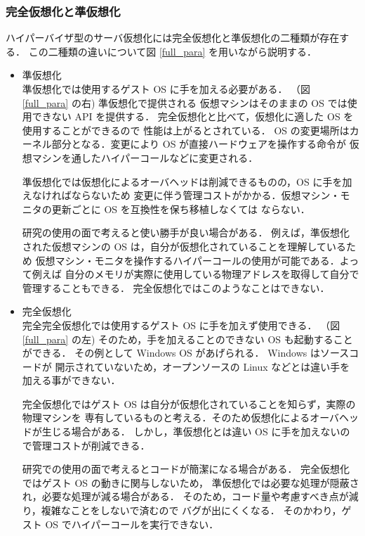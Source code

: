 \documentclass[graduation-thesis]{mlarticle}
\begin{document}
\subsubsection{完全仮想化と準仮想化}
\label{sec-2-1-5}
ハイパーバイザ型のサーバ仮想化には完全仮想化と準仮想化の二種類が存在する．
この二種類の違いについて図 \ref{full_para} を用いながら説明する．

\begin{itemize}
\item 準仮想化\\
      準仮想化では使用するゲスト OS に手を加える必要がある．
（図 \ref{full_para} の右)
準仮想化で提供される
仮想マシンはそのままの OS では使用できない API を提供する．
完全仮想化と比べて，仮想化に適した OS を使用することができるので
性能は上がるとされている．
OS の変更場所はカーネル部分となる．変更により OS が直接ハードウェアを操作する命令が
仮想マシンを通したハイパーコールなどに変更される．

準仮想化では仮想化によるオーバヘッドは削減できるものの，OS に手を加えなければならないため
変更に伴う管理コストがかかる．仮想マシン・モニタの更新ごとに OS を互換性を保ち移植しなくては
ならない．

研究の使用の面で考えると使い勝手が良い場合がある．
例えば，準仮想化された仮想マシンの OS は，自分が仮想化されていることを理解しているため
仮想マシン・モニタを操作するハイパーコールの使用が可能である．よって例えば
自分のメモリが実際に使用している物理アドレスを取得して自分で管理することもできる．
完全仮想化ではこのようなことはできない．

\item 完全仮想化\\
      完全完全仮想化では使用するゲスト OS に手を加えず使用できる．
（図 \ref{full_para} の左)
そのため，手を加えることのできない OS も起動することができる．
その例として Windows OS があげられる． Windows はソースコードが
開示されていないため，オープンソースの Linux などとは違い手を加える事ができない．

完全仮想化ではゲスト OS は自分が仮想化されていることを知らず，実際の物理マシンを
専有しているものと考える．そのため仮想化によるオーバヘッドが生じる場合がある．
しかし，準仮想化とは違い OS に手を加えないので管理コストが削減できる．

研究での使用の面で考えるとコードが簡潔になる場合がある．
完全仮想化ではゲスト OS の動きに関与しないため，
準仮想化では必要な処理が隠蔽され，必要な処理が減る場合がある．
そのため，コード量や考慮すべき点が減り，複雑なことをしないで済むので
バグが出にくくなる．
そのかわり，ゲスト OS でハイパーコールを実行できない．
\end{itemize}
\end{document}
